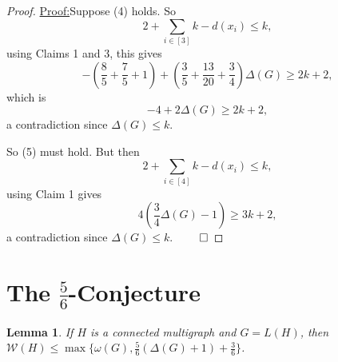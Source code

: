 \documentclass[12pt]{amsart}
\theoremstyle{plain}
\newtheorem{lem}[thm]{Lemma}
\theoremstyle{definition}
\theoremstyle{remark}
\newcommand{\fancy}[1]{\mathcal{#1}}
\newcommand{\W}{\fancy{W}}
\newcommand{\irange}[1]{\left[#1\right]}
\newcommand{\parens}[1]{\left( #1 \right)}
\newenvironment{claimproof}[1]{\par\noindent\underline{Proof:}\space#1}{\leavevmode\unskip\penalty9999
\hbox{}\nobreak\hfill\quad\hbox{$\qed$}}
\begin{document}
\begin{proof}
\begin{claimproof}
Suppose (4) holds.  So
\[2 + \sum_{i \in \irange{3}} k - d(x_i) \le k,\]
using Claims 1 and 3, this gives
\[-\parens{\frac85 + \frac75 + 1} + \parens{\frac35 + \frac{13}{20} + \frac34}\Delta(G)\ge 2k+2,\]
which is
\[-4 + 2\Delta(G) \ge 2k+2,\]
a contradiction since $\Delta(G) \le k$.


So (5) must hold.  But then
\[2 + \sum_{i \in \irange{4}} k - d(x_i) \le k,\]
using Claim 1 gives
\[4\parens{\frac34\Delta(G) - 1} \ge 3k+2,\]
a contradiction since $\Delta(G) \le k$.
\end{claimproof}

\end{proof}

\newpage

\section{The $\frac56$-Conjecture}
\begin{lem}
If $H$ is a connected multigraph and $G = L(H)$, then $\W(H) \le
\max\{\omega(G), \frac56(\Delta(G) + 1) + \frac36\}$.
\end{lem}
\end{document}
